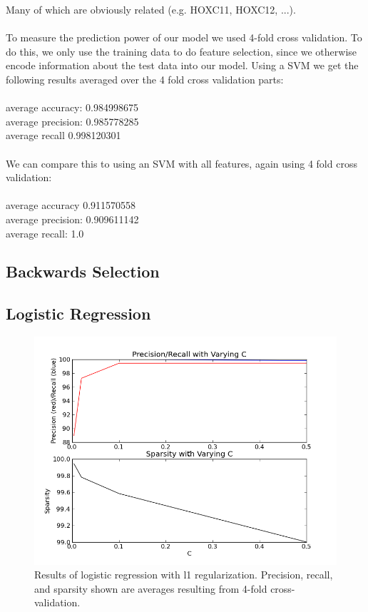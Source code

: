 \documentclass[11pt]{article}
\begin{document}
Many of which are obviously related (e.g. HOXC11, HOXC12, ...).\\\\
To measure the prediction power of our model we used 4-fold cross validation. To do this, we only use the training data to do feature selection, since we otherwise encode information about the test data into our model. Using a SVM we get the following results averaged over the 4 fold cross validation parts:\\\\
average accuracy: 0.984998675\\
average precision: 0.985778285\\
average recall 0.998120301\\\\
We can compare this to using an SVM with all features, again using 4 fold cross validation:\\\\
average accuracy 0.911570558\\
average precision: 0.909611142\\
average recall: 1.0\\
\subsection{Backwards Selection}
\subsection{Logistic Regression}

\begin{figure}[h!]
  \centering
    \includegraphics[scale=0.3]{sparselog.png}
  \caption{Results of logistic regression with l1 regularization. Precision, recall, and sparsity shown are averages resulting from 4-fold cross-validation.}
\label{fig:sparselog}
\end{figure}
\end{document}
